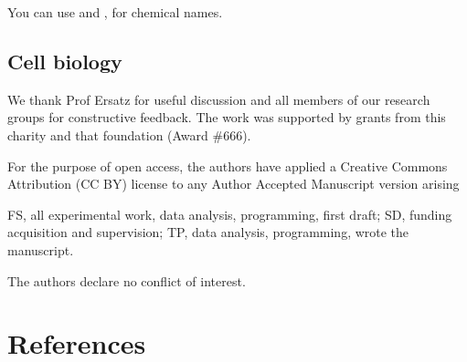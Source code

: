 You can use  and , for chemical names.

\subsection*{Cell biology}

\lipsum[80]

\begin{acknowledgements}
We thank Prof Ersatz for useful discussion and all members of our research groups for constructive feedback.
The work was supported by grants from this charity and that foundation (Award \#666).

For the purpose of open access, the authors have applied a Creative Commons Attribution (CC BY) license to any Author Accepted Manuscript version arising
\end{acknowledgements}

\begin{contributions}
FS, all experimental work, data analysis, programming, first draft;
SD, funding acquisition and supervision;
TP, data analysis, programming, wrote the manuscript.
\end{contributions}

\begin{interests}
The authors declare no conflict of interest.
\end{interests}

\section*{References}
%


